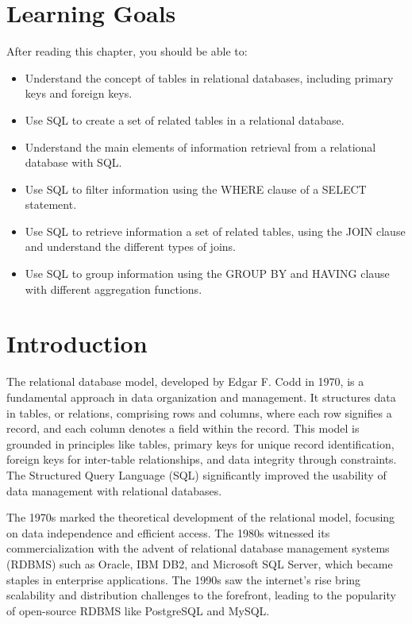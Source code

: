 %
%
\section*{Learning Goals}

After reading this chapter, you should be able to:
\begin{itemize}
   \item Understand the concept of tables in relational databases, including primary keys and foreign keys.
   \item Use SQL to create a set of related tables in a relational database.
   \item Understand the main elements of information retrieval from a relational database with SQL.
   \item Use SQL to filter information using the WHERE clause of a SELECT statement.
   \item Use SQL to retrieve information a set of related tables, using the JOIN clause and understand the different types of joins.
   \item Use SQL to group information using the GROUP BY and HAVING clause with different aggregation functions.
\end{itemize}

\section{Introduction}

The relational database model, developed by Edgar F. Codd in 1970, is a fundamental approach in data organization and management. It structures data in tables, or relations, comprising rows and columns, where each row signifies a record, and each column denotes a field within the record. This model is grounded in principles like tables, primary keys for unique record identification, foreign keys for inter-table relationships, and data integrity through constraints. The Structured Query Language (SQL) significantly improved the usability of data management with relational databases.

The 1970s marked the theoretical development of the relational model, focusing on data independence and efficient access. The 1980s witnessed its commercialization with the advent of relational database management systems (RDBMS) such as Oracle, IBM DB2, and Microsoft SQL Server, which became staples in enterprise applications. The 1990s saw the internet's rise bring scalability and distribution challenges to the forefront, leading to the popularity of open-source RDBMS like PostgreSQL and MySQL.

